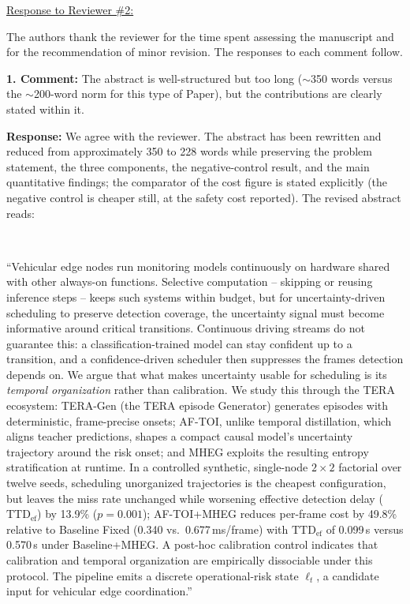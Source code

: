 \documentclass[1p,12pt,authoryear]{elsarticle}
\begin{document}
\begin{large}
\noindent \underline{Response to Reviewer \#2:}
\end{large}

\vspace{10pt}

\noindent The authors thank the reviewer for the time spent assessing the manuscript and for the recommendation of minor revision. The responses to each comment follow.

\vspace{0.5cm}
\noindent \textbf{1. Comment:} The abstract is well-structured but too long ($\sim$350 words versus the $\sim$200-word norm for this type of Paper), but the contributions are clearly stated within it.

\vspace{2mm}
\noindent \textbf{Response:} We agree with the reviewer. The abstract has been rewritten and reduced from approximately 350 to 228 words while preserving the problem statement, the three components, the negative-control result, and the main quantitative findings; the comparator of the cost figure is stated explicitly (the negative control is cheaper still, at the safety cost reported). The revised abstract reads:

~

``Vehicular edge nodes run monitoring models continuously on hardware shared with other always-on functions. Selective computation -- skipping or reusing inference steps -- keeps such systems within budget, but for uncertainty-driven scheduling to preserve detection coverage, the uncertainty signal must become informative around critical transitions. Continuous driving streams do not guarantee this: a classification-trained model can stay confident up to a transition, and a confidence-driven scheduler then suppresses the frames detection depends on. We argue that what makes uncertainty usable for scheduling is its \emph{temporal organization} rather than calibration. We study this through the TERA ecosystem: TERA-Gen (the TERA episode Generator) generates episodes with deterministic, frame-precise onsets; AF-TOI, unlike temporal distillation, which aligns teacher predictions, shapes a compact causal model's uncertainty trajectory around the risk onset; and MHEG exploits the resulting entropy stratification at runtime. In a controlled synthetic, single-node $2\times2$ factorial over twelve seeds, scheduling unorganized trajectories is the cheapest configuration, but leaves the miss rate unchanged while worsening effective detection delay ($\mathrm{TTD}_{\mathrm{ef}}$) by 13.9\% ($p=0.001$); AF-TOI+MHEG reduces per-frame cost by 49.8\% relative to Baseline Fixed (0.340 vs.\ 0.677\,ms/frame) with $\mathrm{TTD}_{\mathrm{ef}}$ of 0.099\,s versus 0.570\,s under Baseline+MHEG. A post-hoc calibration control indicates that calibration and temporal organization are empirically dissociable under this protocol. The pipeline emits a discrete operational-risk state $\ell_t$, a candidate input for vehicular edge coordination.''
\end{document}
